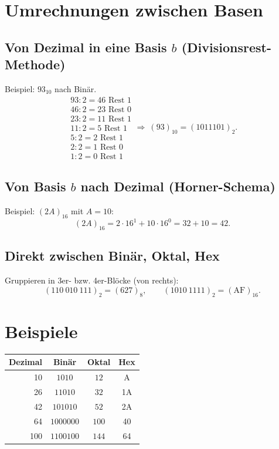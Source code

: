 \documentclass[12pt,a4paper]{book}
\begin{document}
\section{Umrechnungen zwischen Basen}
\subsection*{Von Dezimal in eine Basis \(b\) (Divisionsrest-Methode)}
Beispiel: \(93_{10}\) nach Binär.
\[
\begin{array}{r|l}
	93:2 = 46 \text{ Rest }1\\
	46:2 = 23 \text{ Rest }0\\
	23:2 = 11 \text{ Rest }1\\
	11:2 = 5  \text{ Rest }1\\
	5:2  = 2  \text{ Rest }1\\
	2:2  = 1  \text{ Rest }0\\
	1:2  = 0  \text{ Rest }1
\end{array}
\Rightarrow\ (93)_{10} = (1011101)_2.
\]

\subsection*{Von Basis \(b\) nach Dezimal (Horner-Schema)}
Beispiel: \((2A)_{16}\) mit \(A=10\):
\[
(2A)_{16} = 2\cdot 16^1 + 10\cdot 16^0 = 32 + 10 = 42.
\]

\subsection*{Direkt zwischen Binär, Oktal, Hex}
Gruppieren in 3er- bzw. 4er-Blöcke (von rechts):
\[
(110\ 010\ 111)_2 = (627)_8,\qquad
(1010\ 1111)_2 = (\text{AF})_{16}.
\]

\section{Beispiele}
\begin{center}
	\begin{tabular}{r|c|c|c}
		\textbf{Dezimal} & \textbf{Binär} & \textbf{Oktal} & \textbf{Hex} \\
		\hline
		10 & \(1010\) & \(12\) & A \\
		26 & \(11010\) & \(32\) & 1A \\
		42 & \(101010\) & \(52\) & 2A \\
		64 & \(1000000\) & \(100\) & 40 \\
		100 & \(1100100\) & \(144\) & 64 \\
	\end{tabular}
\end{center}
\end{document}
